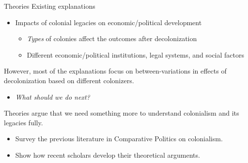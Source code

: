 \documentclass[xcolor=dvipsnames]{beamer}
\begin{document}
	\begin{frame}[fragile]{Theories}
		Existing explanations
		\begin{itemize}
			\item Impacts of colonial legacies on economic/political development
			\begin{itemize}
				\item \textit{Types} of colonies affect the outcomes after decolonization
				\item Different economic/political institutions, legal systems, and social factors
			\end{itemize}
		\end{itemize}
		However, most of the explanations focus on between-variations in effects of decolonization based on different colonizers. \pause
		\begin{itemize}
			\item[] \centering\textit{What should we do next?}
		\end{itemize}
		
	\end{frame}
	
	\begin{frame}[fragile]{Theories}
		\citet{DeJuan2017} argue that we need something more to understand colonialism and its legacies fully.
		\begin{itemize}
			\item Survey the previous literature in Comparative Politics on colonialism.
			\item Show how recent scholars develop their theoretical arguments.
		\end{itemize}
	\end{frame}
	
\end{document}
